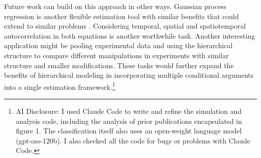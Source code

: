 \documentclass[12pt]{article}
\begin{document}
Future work can build on this approach in other ways. 
Gaussian process regression is another flexible estimation tool with similar benefits that could extend to similar problems \citep{Pratietal2023}.
Considering temporal, spatial and spatiotemporal autocorrelation in both equations is another worthwhile task.
Another interesting application might be pooling experimental data and using the hierarchical structure to compare different manipulations in experiments with similar structure and smaller modifications.
These tasks would further expand the benefits of hierarchical modeling in incorporating multiple conditional arguments into a single estimation framework.\footnote{AI Disclosure: I used Claude Code to write and refine the simulation and analysis code, including the analysis of prior publications encapsulated in figure 1. The classification itself also uses an open-weight language model (gpt-oss-120b). I also checked all the code for bugs or problems with Claude Code.}




\newpage
\singlespace
 


%
\end{document}
